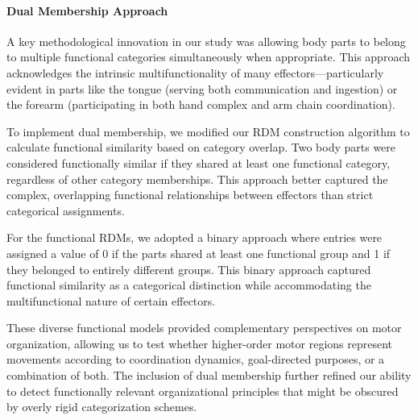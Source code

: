 \documentclass{article}
\begin{document}
\paragraph{Dual Membership Approach}
A key methodological innovation in our study was allowing body parts to belong to multiple functional categories simultaneously when appropriate. This approach acknowledges the intrinsic multifunctionality of many effectors—particularly evident in parts like the tongue (serving both communication and ingestion) or the forearm (participating in both hand complex and arm chain coordination).

To implement dual membership, we modified our RDM construction algorithm to calculate functional similarity based on category overlap. Two body parts were considered functionally similar if they shared at least one functional category, regardless of other category memberships. This approach better captured the complex, overlapping functional relationships between effectors than strict categorical assignments.

For the functional RDMs, we adopted a binary approach where entries were assigned a value of 0 if the parts shared at least one functional group and 1 if they belonged to entirely different groups. This binary approach captured functional similarity as a categorical distinction while accommodating the multifunctional nature of certain effectors.

These diverse functional models provided complementary perspectives on motor organization, allowing us to test whether higher-order motor regions represent movements according to coordination dynamics, goal-directed purposes, or a combination of both. The inclusion of dual membership further refined our ability to detect functionally relevant organizational principles that might be obscured by overly rigid categorization schemes.
\end{document}
